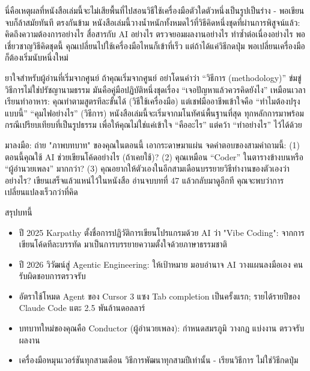 นี่คือเหตุผลที่หนังสือเล่มนี้จะไม่เสียพื้นที่ไปสอนวิธีใช้เครื่องมือตัวใดตัวหนึ่งเป็นรูปเป็นร่าง - พอเขียนจบก็ล้าสมัยทันที ตรงกันข้าม หนังสือเล่มนี้วางน้ำหนักทั้งหมดไว้ที่วิธีคิดหนึ่งชุดที่ผ่านการพิสูจน์แล้ว: คิดถึงความต้องการอย่างไร สื่อสารกับ AI อย่างไร ตรวจยอมผลงานอย่างไร ทำซ้ำต่อเนื่องอย่างไร พอเชี่ยวชาญวิธีคิดชุดนี้ คุณเปลี่ยนไปใช้เครื่องมือไหนก็เข้าที่เร็ว แต่ถ้าได้แค่วิธีกดปุ่ม พอเปลี่ยนเครื่องมือก็ต้องเริ่มนับหนึ่งใหม่

\begin{tcbinfo}{ยาใจสำหรับผู้อ่านที่เริ่มจากศูนย์}
ถ้าคุณเริ่มจากศูนย์ อย่าโดนคำว่า “วิธีการ (methodology)” ข่มขู่ วิธีการไม่ใช่ปรัชญานามธรรม มันคือคู่มือปฏิบัติหนึ่งชุดเรื่อง “เจอปัญหาแล้วควรคิดยังไง” เหมือนเวลาเรียนทำอาหาร: คุณทำตามสูตรทีละขั้นได้ (วิธีใช้เครื่องมือ) แต่เชฟมืออาชีพเข้าใจคือ “ทำไมต้องปรุงแบบนี้” “คุมไฟอย่างไร” (วิธีการ) หนังสือเล่มนี้จะเริ่มจากมโนทัศน์พื้นฐานที่สุด ทุกหลักการมาพร้อมกรณีเปรียบเทียบที่เป็นรูปธรรม เพื่อให้คุณไม่ใช่แค่เข้าใจ “คืออะไร” แต่คว้า “ทำอย่างไร” ไว้ได้ด้วย

\end{tcbinfo}

\begin{tcbpractice}{มาลงมือ: ถ่าย "ภาพบทบาท" ของคุณในตอนนี้}
เอากระดาษมาแผ่น จดคำตอบของสามคำถามนี้: (1) ตอนนี้คุณใช้ AI ช่วยเขียนโค้ดอย่างไร (ถ้าเคยใช้)? (2) คุณเหมือน “Coder” ในตารางข้างบนหรือ “ผู้อำนวยเพลง” มากกว่า? (3) คุณอยากให้ตัวเองในอีกสามเดือนบรรยายวิธีทำงานของตัวเองว่าอย่างไร? เขียนเสร็จแล้วแหน่ไว้ในหนังสือ อ่านจบบทที่ 47 แล้วกลับมาดูอีกที คุณจะพบว่าการเปลี่ยนแปลงเร็วกว่าที่คิด

\end{tcbpractice}

\begin{tcbsummary}{สรุปบทนี้}
\begin{itemize}
  \item ปี 2025 Karpathy ตั้งชื่อการปฏิวัติการเขียนโปรแกรมด้วย AI ว่า "Vibe Coding": จากการเขียนโค้ดทีละบรรทัด มาเป็นการบรรยายความตั้งใจด้วยภาษาธรรมชาติ
  \item ปี 2026 วิวัฒน์สู่ Agentic Engineering: ให้เป้าหมาย มอบอำนาจ AI วางแผนลงมือเอง คนรับผิดชอบการตรวจรับ
  \item อัตราใช้โหมด Agent ของ Cursor 3 แซง Tab completion เป็นครั้งแรก; รายได้รายปีของ Claude Code แตะ 2.5 พันล้านดอลลาร์
  \item บทบาทใหม่ของคุณคือ Conductor (ผู้อำนวยเพลง): กำหนดสมรภูมิ วางกฎ แบ่งงาน ตรวจรับผลงาน
  \item เครื่องมือหมุนเวอร์ชันทุกสามเดือน วิธีการพัฒนาทุกสามปีเท่านั้น - เรียนวิธีการ ไม่ใช่วิธีกดปุ่ม
\end{itemize}

\end{tcbsummary}
